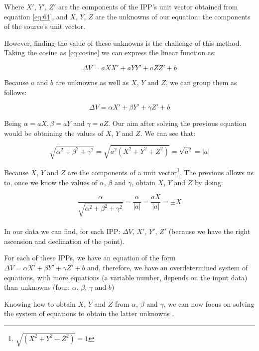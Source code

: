 Where $X'$, $Y'$, $Z'$ are the components of the IPP's unit vector obtained from equation \ref{eq:61}, and $X$, $Y$, $Z$ are the unknowns of our equation: the components of the source's unit vector.

However, finding the value of these unknowns is the challenge of this method. Taking the cosine as \ref{eq:cosine} we can express the linear function as:

\begin{equation} \label{eq:substitute}
\Delta V = aXX' + aYY' + aZZ' + b
\end{equation}

Because $a$ and $b$ are unknowns as well as $X$, $Y$ and $Z$, we can group them as follows:

\begin{equation} \label{eq:newNames}
\Delta V = \alpha X' +  \beta Y' +  \gamma Z' + b
\end{equation}

Being $\alpha = aX, \beta = aY$ and $\gamma = aZ$. Our aim after solving the previous equation would be obtaining the values of $X$, $Y$ and $Z$. We can see that:

\begin{equation} \label{eq:elTrucoDelAlmendruco}
\sqrt{\alpha^{2}+\beta^{2}+\gamma^{2}} = \sqrt{a^{2}(X^{2}+Y^{2}+Z^{2})} = \sqrt{a^{2}} = |a|
\end{equation}

Because $X$, $Y$ and $Z$ are the components of a unit vector\footnote{$\sqrt{(X^{2}+Y^{2}+Z^{2})} = 1$}. The previous allows us to, once we know the values of $\alpha$, $\beta$ and $\gamma$, obtain $X$, $Y$ and $Z$ by doing:

\begin{equation} \label{eq:iso}
\frac{\alpha}{\sqrt{\alpha^{2}+\beta^{2}+\gamma^{2}}} = \frac{\alpha}{|a|} = \frac{aX}{|a|} = \pm X
\end{equation} \\

In our data we can find, for each IPP: $\Delta V$, $X'$, $Y'$, $Z'$ (because we have the right ascension and declination of the point).

For each of these IPPs, we have an equation of the form $\Delta V = \alpha X' +  \beta Y' +  \gamma Z' + b$ and, therefore, we have an overdetermined system of equations, with more equations (a variable number, depends on the input data) than unknowns (four: $\alpha$, $\beta$, $\gamma$ and $b$)

Knowing how to obtain $X$, $Y$ and $Z$ from $\alpha$, $\beta$ and $\gamma$, we can now focus on solving the system of equations to obtain the latter unknowns .

